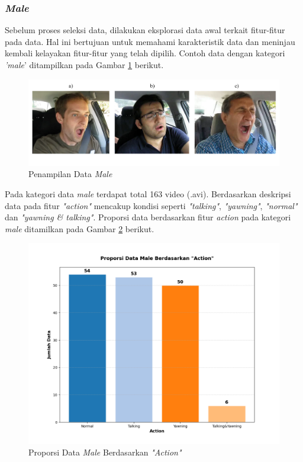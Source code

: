 \subsubsection{\textit{Male}}
          Sebelum proses seleksi data, dilakukan eksplorasi data awal terkait fitur-fitur pada data. Hal ini bertujuan untuk memahami karakteristik data dan meninjau kembali kelayakan fitur-fitur yang telah dipilih. Contoh data dengan kategori \textit{'male}' ditampilkan pada Gambar \ref{male gambar1} berikut.
       
     \begin{figure}[H]
         \centering
             \includegraphics[width=\textwidth]{figures/bab4/male_contoh.png}
             \caption{Penampilan Data \textit{Male}}
             \label{male gambar1}
     \end{figure}

    Pada kategori data \textit{male} terdapat total 163 video (.avi). Berdasarkan deskripsi data pada fitur \textit{"action"} mencakup kondisi seperti \textit{"talking"}, \textit{"yawning"}, \textit{"normal"} dan \textit{"yawning \& talking"}. Proporsi data berdasarkan fitur \textit{action} pada kategori \textit{male} ditamilkan pada Gambar \ref{Proporsi Data Male Berdasarkan "Action"} berikut.
    

   

     \begin{figure}[H]
             \centering
         \includegraphics[width=0.75\linewidth]{figures/bab4/data_male.png}
         \caption{Proporsi Data \textit{Male} Berdasarkan \textit{"Action"}}
         \label{Proporsi Data Male Berdasarkan "Action"}
     \end{figure}

